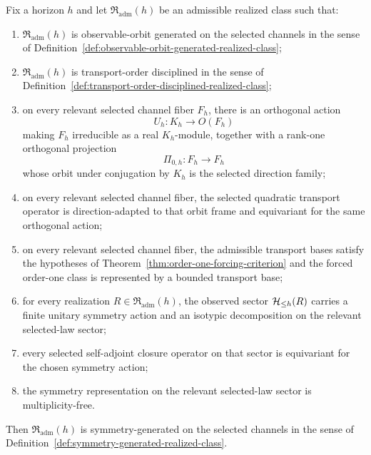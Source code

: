 \begin{corollary}
\label{cor:observable-orbit-frame-implies-symmetry-generated}
Fix a horizon $h$ and let $\mathfrak R_{\mathrm{adm}}(h)$ be an admissible
realized class such that:
\begin{enumerate}[label=(\roman*), leftmargin=2em, itemsep=0.2em]
\item $\mathfrak R_{\mathrm{adm}}(h)$ is observable-orbit generated on the
      selected channels in the sense of
      Definition~\ref{def:observable-orbit-generated-realized-class};
\item $\mathfrak R_{\mathrm{adm}}(h)$ is transport-order disciplined in the
      sense of
      Definition~\ref{def:transport-order-disciplined-realized-class};
\item on every relevant selected channel fiber $F_h$, there is an orthogonal
      action
      \[
      U_h:K_h\to O(F_h)
      \]
      making $F_h$ irreducible as a real $K_h$-module, together with a
      rank-one orthogonal projection
      \[
      \Pi_{0,h}:F_h\to F_h
      \]
      whose orbit under conjugation by $K_h$ is the selected direction family;
\item on every relevant selected channel fiber, the selected quadratic
      transport operator is direction-adapted to that orbit frame and
      equivariant for the same orthogonal action;
\item on every relevant selected channel fiber, the admissible transport bases
      satisfy the hypotheses of
      Theorem~\ref{thm:order-one-forcing-criterion} and the forced order-one
      class is represented by a bounded transport base;
\item for every realization $R\in\mathfrak R_{\mathrm{adm}}(h)$, the observed
      sector $\mathcal{H}_{\le h}(R)$ carries a finite unitary symmetry action and an
      isotypic decomposition on the relevant selected-law sector;
\item every selected self-adjoint closure operator on that sector is
      equivariant for the chosen symmetry action;
\item the symmetry representation on the relevant selected-law sector is
      multiplicity-free.
\end{enumerate}
Then $\mathfrak R_{\mathrm{adm}}(h)$ is symmetry-generated on the selected
channels in the sense of
Definition~\ref{def:symmetry-generated-realized-class}.
\end{corollary}


